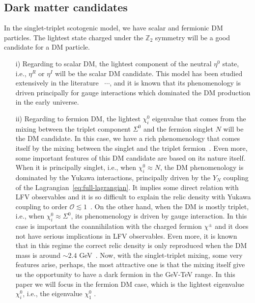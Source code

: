 \documentclass[12pt,letterpaper]{article}
\begin{document}
\subsection{Dark matter candidates}
\label{sec:dark-matter}

In the singlet-triplet scotogenic model, we have scalar and fermionic DM particles. The lightest state charged under the $\mathbb{Z}_2$ symmetry will be a good candidate for a DM particle. 
\begin{enumerate}
\item[i)] Regarding to scalar DM, the lightest component of the neutral $\eta^0$ state, i.e., $\eta^R$ or $\eta^I$ will be the scalar DM candidate. 
This model has been studied extensively in the literature~\cite{Deshpande:1977rw} $\cdots$, and it is known that its phenomenology is driven principally for gauge interactions which dominated the DM production in the early universe. 

\item[ii)] Regarding to fermion DM, the lightest $\chi_i^0$ eigenvalue that comes from the mixing between the triplet component $\Sigma^0$ and the fermion singlet $N$ will be the DM candidate. In this case, we have a rich phenomenology that comes itself by the mixing between the singlet and the triplet fermion~\cite{Hirsch:2013ola, Rocha-Moran:2016enp, Merle:2016scw}. Even more, some important features of this DM candidate are based on its nature itself. When it is principally singlet, i.e., when $\chi_i^0\approx N$, the DM phenomenology is dominated by the Yukawa interactions, principally driven by the $Y_N$ coupling of the Lagrangian~\ref{eq:full-lagrangian}. It implies some direct relation with LFV observables and it is so difficult to explain the relic density with Yukawa coupling to order $\mathcal{O}\lesssim 1$~\cite{Ibarra:2016dlb}. 
On the other hand, when the DM is mostly triplet, i.e., when $\chi_i^0\approx \Sigma^0$, its phenomenology is driven by gauge interaction. In this case is important the coannihilation with the charged fermion $\chi^{\pm}$ and it does not have serious implications in LFV observables. Even more, it is known that in this regime the correct relic density is only reproduced when the DM mass is around $\sim 2.4$ GeV~\cite{Ma:2008cu}. 
Now, with the singlet-triplet mixing, some very features arise, perhaps, the most attractive one is that the mixing itself give us the opportunity to have a dark fermion in the GeV-TeV range.     
In this paper we will focus in the fermion DM case, which is the lightest eigenvalue $\chi_i^0$, i.e., the eigenvalue $\chi_1^0$ .
\end{enumerate}
\end{document}
